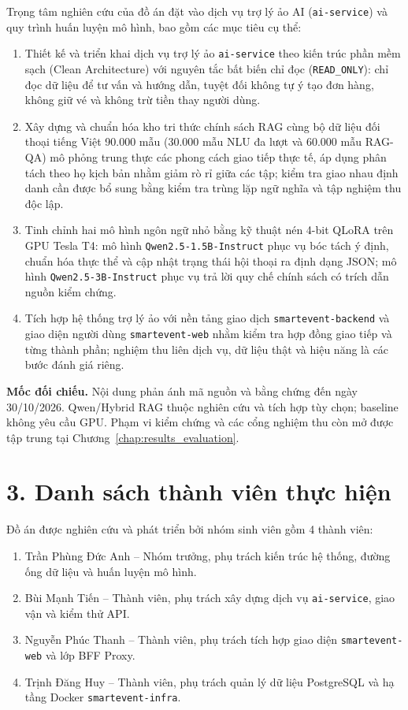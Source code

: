 Trọng tâm nghiên cứu của đồ án đặt vào dịch vụ trợ lý ảo AI (\texttt{ai-service}) và quy trình huấn luyện mô hình, bao gồm các mục tiêu cụ thể:
\begin{enumerate}[nosep]
  \item Thiết kế và triển khai dịch vụ trợ lý ảo \texttt{ai-service} theo kiến trúc phần mềm sạch (Clean Architecture) với nguyên tắc bất biến chỉ đọc (\texttt{READ\_ONLY}): chỉ đọc dữ liệu để tư vấn và hướng dẫn, tuyệt đối không tự ý tạo đơn hàng, không giữ vé và không trừ tiền thay người dùng.
  \item Xây dựng và chuẩn hóa kho tri thức chính sách RAG cùng bộ dữ liệu đối thoại tiếng Việt 90.000 mẫu (30.000 mẫu NLU đa lượt và 60.000 mẫu RAG-QA) mô phỏng trung thực các phong cách giao tiếp thực tế, áp dụng phân tách theo họ kịch bản nhằm giảm rò rỉ giữa các tập; kiểm tra giao nhau định danh cần được bổ sung bằng kiểm tra trùng lặp ngữ nghĩa và tập nghiệm thu độc lập.
  \item Tinh chỉnh hai mô hình ngôn ngữ nhỏ bằng kỹ thuật nén 4-bit QLoRA trên GPU Tesla T4: mô hình \texttt{Qwen2.5-1.5B-Instruct} phục vụ bóc tách ý định, chuẩn hóa thực thể và cập nhật trạng thái hội thoại ra định dạng JSON; mô hình \texttt{Qwen2.5-3B-Instruct} phục vụ trả lời quy chế chính sách có trích dẫn nguồn kiểm chứng.
  \item Tích hợp hệ thống trợ lý ảo với nền tảng giao dịch \texttt{smartevent-backend} và giao diện người dùng \texttt{smartevent-web} nhằm kiểm tra hợp đồng giao tiếp và từng thành phần; nghiệm thu liên dịch vụ, dữ liệu thật và hiệu năng là các bước đánh giá riêng.
\end{enumerate}

\noindent\textbf{Mốc đối chiếu.} Nội dung phản ánh mã nguồn và bằng chứng đến ngày 30/10/2026. Qwen/Hybrid RAG thuộc nghiên cứu và tích hợp tùy chọn; baseline không yêu cầu GPU. Phạm vi kiểm chứng và các cổng nghiệm thu còn mở được tập trung tại Chương~\ref{chap:results_evaluation}.

\section*{3. Danh sách thành viên thực hiện}
{}

Đồ án được nghiên cứu và phát triển bởi nhóm sinh viên gồm 4 thành viên:
\begin{enumerate}[nosep]
  \item Trần Phùng Đức Anh -- Nhóm trưởng, phụ trách kiến trúc hệ thống, đường ống dữ liệu và huấn luyện mô hình.
  \item Bùi Mạnh Tiến -- Thành viên, phụ trách xây dựng dịch vụ \texttt{ai-service}, giao vận và kiểm thử API.
  \item Nguyễn Phúc Thanh -- Thành viên, phụ trách tích hợp giao diện \texttt{smartevent-web} và lớp BFF Proxy.
  \item Trịnh Đăng Huy -- Thành viên, phụ trách quản lý dữ liệu PostgreSQL và hạ tầng Docker \texttt{smartevent-infra}.
\end{enumerate}

